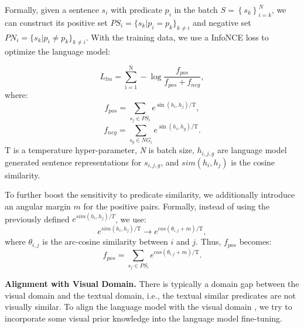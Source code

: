 \documentclass[letterpaper]{article} %
\begin{document}
Formally, given a sentence $s_i$ with predicate $p_i$ in the batch $S=\left\{s_k\right\}_{i=k}^N$, we can construct its positive set ${PS}_i=\{s_k|p_i=p_k \}_{k\neq i}$ and negative set ${PN}_i=\{s_k|p_i \neq p_k \}_{k\neq i}$.
With the training data, we use a InfoNCE loss to optimize the language model:

\begin{equation}
\label{eq:rct}
L_{l m}= 
\sum_{\mathrm{i}=1}^{\mathrm{N}}-\log \frac{f_{pos}}{f_{pos}+f_{neg}} ,
\end{equation}
where:
\begin{equation}
    f_{pos} = \sum_{s_{j} \in P S_{i}} e^{\sin \left(h_{i}, h_{j}\right) / \mathrm{T}},
\end{equation}
\begin{equation}
    f_{neg} = \sum_{s_{g} \in N G_{i}} e^{\sin \left(h_{i}, h_{g}\right) / \mathrm{T}}.
\end{equation}
$\mathrm{T}$ is a temperature hyper-parameter, \textit{N} is batch size, $h_{i,j,g}$ are language model generated sentence representations for $s_{i,j,g}$, and $sim\left(h_i,h_j\right)$ is the cosine similarity.

To further boost the sensitivity to predicate similarity, we additionally introduce an angular margin $m$ for the positive pairs.
Formally, instead of using the previously defined $e^{sim ( h_{i},h_{j} )/T}$, we use:
\begin{equation}
e^{sim ( h_{i},h_{j} )/\mathrm{T}} \to e^{cos ( \theta _{i,j}+m )/\mathrm{T} },
\end{equation}
where $ \theta _{i,j} $ is the arc-cosine similarity between $ i $ and $ j $.
Thus, $f_{pos}$ becomes:
\begin{equation}
    f_{pos} = \sum_{s_{j} \in P S_{i}} e^{cos ( \theta _{i,j}+m )/\mathrm{T}}.
\end{equation}


\noindent \textbf{Alignment with Visual Domain.} There is typically a domain gap between the visual domain and the textual domain, i.e., the textual similar predicates are not visually similar.
To align the language model with the visual domain \cite{li2023winner,fang2022multi}, we try to incorporate some visual prior knowledge into the language model fine-tuning.
\end{document}

